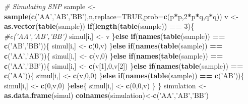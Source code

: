 \documentclass[]{article}
\newenvironment{Shaded}{\begin{snugshade}}{\end{snugshade}}
\newcommand{\KeywordTok}[1]{\textcolor[rgb]{0.13,0.29,0.53}{\textbf{#1}}}
\newcommand{\DataTypeTok}[1]{\textcolor[rgb]{0.13,0.29,0.53}{#1}}
\newcommand{\DecValTok}[1]{\textcolor[rgb]{0.00,0.00,0.81}{#1}}
\newcommand{\StringTok}[1]{\textcolor[rgb]{0.31,0.60,0.02}{#1}}
\newcommand{\CommentTok}[1]{\textcolor[rgb]{0.56,0.35,0.01}{\textit{#1}}}
\newcommand{\OtherTok}[1]{\textcolor[rgb]{0.56,0.35,0.01}{#1}}
\newcommand{\ControlFlowTok}[1]{\textcolor[rgb]{0.13,0.29,0.53}{\textbf{#1}}}
\newcommand{\OperatorTok}[1]{\textcolor[rgb]{0.81,0.36,0.00}{\textbf{#1}}}
\newcommand{\NormalTok}[1]{#1}
\begin{document}
\begin{Shaded}
\begin{Highlighting}[]
  \CommentTok{# Simulating SNP}
\NormalTok{  sample <-}\StringTok{ }\KeywordTok{sample}\NormalTok{(}\KeywordTok{c}\NormalTok{(}\StringTok{'AA'}\NormalTok{,}\StringTok{'AB'}\NormalTok{,}\StringTok{'BB'}\NormalTok{),n,}\DataTypeTok{replace=}\OtherTok{TRUE}\NormalTok{,}\DataTypeTok{prob=}\KeywordTok{c}\NormalTok{(p}\OperatorTok{*}\NormalTok{p,}\DecValTok{2}\OperatorTok{*}\NormalTok{p}\OperatorTok{*}\NormalTok{q,q}\OperatorTok{*}\NormalTok{q)) }
\NormalTok{  v <-}\StringTok{ }\KeywordTok{as.vector}\NormalTok{(}\KeywordTok{table}\NormalTok{(sample))}
  \ControlFlowTok{if}\NormalTok{(}\KeywordTok{length}\NormalTok{(}\KeywordTok{table}\NormalTok{(sample)) }\OperatorTok{==}\StringTok{ }\DecValTok{3}\NormalTok{)\{ }\CommentTok{#c('AA','AB','BB')}
\NormalTok{    simul[i,] <-}\StringTok{ }\NormalTok{v}
\NormalTok{  \}}\ControlFlowTok{else} \ControlFlowTok{if}\NormalTok{(}\KeywordTok{names}\NormalTok{(}\KeywordTok{table}\NormalTok{(sample)) }\OperatorTok{==}\StringTok{ }\KeywordTok{c}\NormalTok{(}\StringTok{'AB'}\NormalTok{,}\StringTok{'BB'}\NormalTok{))\{}
\NormalTok{    simul[i,] <-}\StringTok{ }\KeywordTok{c}\NormalTok{(}\DecValTok{0}\NormalTok{,v)}
\NormalTok{  \}}\ControlFlowTok{else} \ControlFlowTok{if}\NormalTok{(}\KeywordTok{names}\NormalTok{(}\KeywordTok{table}\NormalTok{(sample)) }\OperatorTok{==}\StringTok{ }\KeywordTok{c}\NormalTok{(}\StringTok{'AA'}\NormalTok{,}\StringTok{'AB'}\NormalTok{))\{}
\NormalTok{    simul[i,] <-}\StringTok{ }\KeywordTok{c}\NormalTok{(v,}\DecValTok{0}\NormalTok{)}
\NormalTok{  \}}\ControlFlowTok{else} \ControlFlowTok{if}\NormalTok{(}\KeywordTok{names}\NormalTok{(}\KeywordTok{table}\NormalTok{(sample)) }\OperatorTok{==}\StringTok{ }\KeywordTok{c}\NormalTok{(}\StringTok{'AA'}\NormalTok{,}\StringTok{'BB'}\NormalTok{))\{}
\NormalTok{    simul[i,] <-}\StringTok{ }\KeywordTok{c}\NormalTok{(v[}\DecValTok{1}\NormalTok{],}\DecValTok{0}\NormalTok{,v[}\DecValTok{2}\NormalTok{])}
\NormalTok{  \}}\ControlFlowTok{else} \ControlFlowTok{if}\NormalTok{(}\KeywordTok{names}\NormalTok{(}\KeywordTok{table}\NormalTok{(sample)) }\OperatorTok{==}\StringTok{ }\KeywordTok{c}\NormalTok{(}\StringTok{'AA'}\NormalTok{))\{}
\NormalTok{    simul[i,] <-}\StringTok{ }\KeywordTok{c}\NormalTok{(v,}\DecValTok{0}\NormalTok{,}\DecValTok{0}\NormalTok{)}
\NormalTok{  \}}\ControlFlowTok{else} \ControlFlowTok{if}\NormalTok{(}\KeywordTok{names}\NormalTok{(}\KeywordTok{table}\NormalTok{(sample)) }\OperatorTok{==}\StringTok{ }\KeywordTok{c}\NormalTok{(}\StringTok{'AB'}\NormalTok{))\{}
\NormalTok{    simul[i,] <-}\StringTok{ }\KeywordTok{c}\NormalTok{(}\DecValTok{0}\NormalTok{,v,}\DecValTok{0}\NormalTok{)}
\NormalTok{  \}}\ControlFlowTok{else}\NormalTok{\{}
\NormalTok{    simul[i,] <-}\StringTok{ }\KeywordTok{c}\NormalTok{(}\DecValTok{0}\NormalTok{,}\DecValTok{0}\NormalTok{,v)}
\NormalTok{  \}}
\NormalTok{\}}
\NormalTok{simulation <-}\StringTok{ }\KeywordTok{as.data.frame}\NormalTok{(simul)}
\KeywordTok{colnames}\NormalTok{(simulation)<-}\KeywordTok{c}\NormalTok{(}\StringTok{'AA'}\NormalTok{,}\StringTok{'AB'}\NormalTok{,}\StringTok{'BB'}\NormalTok{)}
\end{Highlighting}
\end{Shaded}
\end{document}
